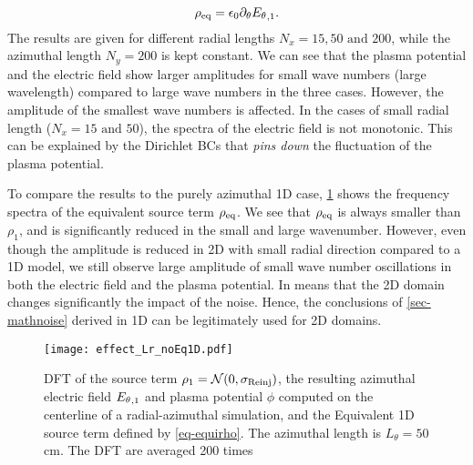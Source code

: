       \begin{equation} \label{eq-equirho}
        \rho_{\rm eq} = \epsilon_0 \partial_\theta {\ensuremath{E_{\theta}}}_{, 1}.
      \end{equation}
      The results are given for different radial lengths $N_x=15,50 \text{ and } 200$, while the azimuthal length $N_y=200$ is kept constant.
      We can see that the plasma potential and the electric field show larger amplitudes for small wave numbers (large wavelength) compared to large wave numbers in the three cases.
      However, the amplitude of the smallest wave numbers is affected.
      In the cases of small radial length ($N_x=15 \text{ and } 50$), the spectra of the electric field is not monotonic.
      This can be explained by the Dirichlet \ac{BC}s that {\it pins down} the fluctuation of the plasma potential.
      
      To compare the results to the purely azimuthal \ac{1D} case, \cref{fig-dftLr} shows the frequency spectra of the equivalent source term $\rho_{\rm eq}$.
      We see that $\rho_{\rm eq}$ is always smaller than $\rho_1$, and is significantly reduced in the small and large wavenumber.
      However, even though the amplitude is reduced in \ac{2D} with small radial direction compared to a \ac{1D} model, we still observe large amplitude of small wave number oscillations in both the electric field and the plasma potential.
      In means that the \ac{2D} domain changes significantly the impact of the noise.
      Hence, the conclusions of  \cref{sec-mathnoise} derived in \ac{1D} can be legitimately used for \ac{2D} domains.
      
      \begin{figure}[hbt]
        \centering
        \texttt{[image: effect\_Lr\_noEq1D.pdf]}
        \caption{ DFT of the source term $\rho_1 = \mathcal{N}(0, \sigma_{\rm Reinj})$, the resulting azimuthal electric field ${E_{\theta}}_{, 1}$ and plasma potential $\phi$ computed on the centerline of a radial-azimuthal simulation, and the Equivalent \acs{1D} source term defined by \cref{eq-equirho}. The azimuthal length is $L_{\theta}=50$ cm. The \acs{DFT} are averaged 200 times  }
        \label{fig-dftLr}
        
      \end{figure}





